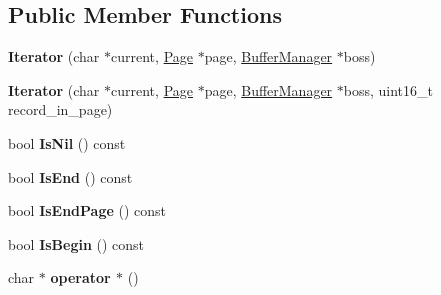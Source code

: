 \subsection*{Public Member Functions}
\begin{DoxyCompactItemize}
\item 
\mbox{\label{class_buffer_manager_1_1_iterator_3_01char_01_5_01_4_a79c86c77e7cfc623fdeb085081eb2789}} 
{\bfseries Iterator} (char $\ast$current, \mbox{\hyperlink{struct_page}{Page}} $\ast$page, \mbox{\hyperlink{class_buffer_manager}{Buffer\+Manager}} $\ast$boss)
\item 
\mbox{\label{class_buffer_manager_1_1_iterator_3_01char_01_5_01_4_a22a7d591dfa5e9146fd2c615a208ca55}} 
{\bfseries Iterator} (char $\ast$current, \mbox{\hyperlink{struct_page}{Page}} $\ast$page, \mbox{\hyperlink{class_buffer_manager}{Buffer\+Manager}} $\ast$boss, uint16\+\_\+t record\+\_\+in\+\_\+page)
\item 
\mbox{\label{class_buffer_manager_1_1_iterator_3_01char_01_5_01_4_af00972cbcb21f0baec529be8c833574a}} 
bool {\bfseries Is\+Nil} () const
\item 
\mbox{\label{class_buffer_manager_1_1_iterator_3_01char_01_5_01_4_a4cc6a78dc11f9f13664906425f49eb30}} 
bool {\bfseries Is\+End} () const
\item 
\mbox{\label{class_buffer_manager_1_1_iterator_3_01char_01_5_01_4_a2209e56f5733332f04ac19b6f1e7e8be}} 
bool {\bfseries Is\+End\+Page} () const
\item 
\mbox{\label{class_buffer_manager_1_1_iterator_3_01char_01_5_01_4_a66af05f7a03d811df01f0e45f7fb770a}} 
bool {\bfseries Is\+Begin} () const
\item 
\mbox{\label{class_buffer_manager_1_1_iterator_3_01char_01_5_01_4_ac83da3470d1cbf62b050701463cff8c9}} 
char $\ast$ {\bfseries operator $\ast$} ()
\item 

\end{DoxyCompactItemize}
